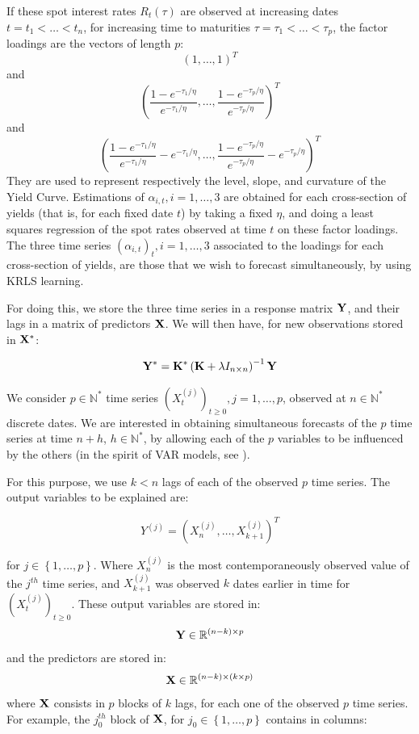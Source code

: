 If these spot interest rates $R_t(\tau)$ are observed at increasing dates $t = t_1 < \ldots < t_n$, for increasing time to maturities $\tau = \tau_1 < \ldots < \tau_p$, the factor loadings are the vectors of length $p$:  
$$
(1, \ldots, 1)^T
$$
and
$$
\left(\frac{1-e^{-\tau_1/\eta}}{e^{-\tau_1/\eta}}, \ldots, \frac{1-e^{-\tau_p/\eta}}{e^{-\tau_p/\eta}}\right)^T
$$ 
and 
$$
\left(\frac{1-e^{-\tau_1/\eta}}{e^{-\tau_1/\eta}} - e^{-\tau_1/\eta}, \ldots, \frac{1-e^{-\tau_p/\eta}}{e^{-\tau_p/\eta}} - e^{-\tau_p/\eta}\right)^T
$$ 
They are used to represent respectively the level, slope, and curvature of the Yield Curve. Estimations of $\alpha_{i, t}, i = 1, \ldots, 3$ are obtained for each cross-section of yields (that is, for each fixed date $t$) by taking a fixed $\eta$, and doing a least squares regression of the spot rates observed at time $t$ on these factor loadings. The three time series $(\alpha_{i, t})_t, i = 1, \ldots, 3$ associated to the loadings for each cross-section of yields, are those that we wish to forecast simultaneously, by using KRLS learning.

\medskip

 For doing this, we store the three time series in a response matrix ${\bf Y}$, and their lags in a matrix of predictors ${\bf X}$. We will then have, for new observations stored in ${\bf X}^*$:

 $$
 {\bf Y}^* = {\bf K^*} \left( {\bf K} + \lambda I_{n \times n} \right)^{-1} {\bf Y}
 $$
 
 We consider $p \in \mathbb{N}^*$ time series $(X_t^{(j)})_{t \geq 0}, j = 1, \ldots, p$,
observed at $n \in \mathbb{N}^*$ discrete dates. We are interested in
obtaining simultaneous forecasts of the $p$ time series at time $n+h$, $h \in
\mathbb{N}^*$, by allowing each of the $p$ variables to be influenced by the
others (in the spirit of VAR models, see \cite{lutkepohl2005new}).

\medskip

For this purpose, we use $k < n$ lags of each of the observed $p$ time
series. The output variables to be explained are:

\begin{equation}
Y^{(j)} = \left(X^{(j)}_n, \ldots, X^{(j)}_{k+1} \right)^T
\end{equation}

for $j \in \left\lbrace 1, \ldots,
p \right\rbrace$. Where $X^{(j)}_n$ is the most contemporaneously observed value
of the $j^{th}$ time series, and $X^{(j)}_{k+1}$ was observed $k$ dates earlier
in time for $(X^{(j)}_t)_{t \geq 0}$. These output variables are stored in: $$ {\bf Y} \in \mathbb{R}^{(n-k) \times p} $$ and the predictors are
stored in: $$ {\bf X} \in \mathbb{R}^{(n-k) \times (k \times p)} $$
where ${\bf X}$ consists in $p$ blocks of $k$ lags, for each one of the observed
$p$ time series. For example, the $j_0^{th}$ block of ${\bf X}$, for $j_0 \in
\left\lbrace 1, \ldots, p \right\rbrace$  contains in columns:

